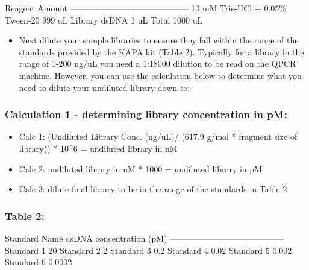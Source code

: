 \documentclass[
  letterpaper,
  DIV=11,
  numbers=noendperiod]{scrreprt}
\providecommand{\tightlist}{%
  \setlength{\itemsep}{0pt}\setlength{\parskip}{0pt}}\usepackage{longtable,booktabs,array}
\begin{document}
\textbar{} Reagent \textbar{} Amount \textbar{}
\textbar---------------------------------\textbar---------\textbar{}
\textbar{} 10 mM Tris-HCl + 0.05\% Tween-20 \textbar{} 999 uL \textbar{}
\textbar{} Library dsDNA \textbar{} 1 uL \textbar{} \textbar{} Total
\textbar{} 1000 uL \textbar{}

\begin{itemize}
\tightlist
\item
  Next dilute your sample libraries to ensure they fall within the range
  of the standards provided by the KAPA kit (Table 2). Typically for a
  library in the range of 1-200 ng/uL you need a 1:18000 dilution to be
  read on the QPCR machine. However, you can use the calculation below
  to determine what you need to dilute your undiluted library down to:
\end{itemize}

\hypertarget{calculation-1---determining-library-concentration-in-pm}{%
\subsubsection*{\texorpdfstring{\textbf{Calculation 1 - determining
library concentration in
pM:}}{Calculation 1 - determining library concentration in pM:}}\label{calculation-1---determining-library-concentration-in-pm}}

\begin{itemize}
\item
  Calc 1: (Undiluted Library Conc. (ng/uL)/ (617.9 g/mol * fragment size
  of library)) * 10\^{}6 = undiluted library in nM
\item
  Calc 2: undiluted library in nM * 1000 = undiluted library in pM
\item
  Calc 3: dilute final library to be in the range of the standards in
  Table 2
\end{itemize}

\hypertarget{table-2}{%
\subsubsection*{\texorpdfstring{\textbf{Table
2:}}{Table 2:}}\label{table-2}}

\textbar{} Standard Name \textbar{} dsDNA concentration (pM) \textbar{}
\textbar---------------\textbar--------------------------\textbar{}
\textbar{} Standard 1 \textbar{} 20 \textbar{} \textbar{} Standard 2
\textbar{} 2 \textbar{} \textbar{} Standard 3 \textbar{} 0.2 \textbar{}
\textbar{} Standard 4 \textbar{} 0.02 \textbar{} \textbar{} Standard 5
\textbar{} 0.002 \textbar{} \textbar{} Standard 6 \textbar{} 0.0002
\textbar{}
\end{document}
